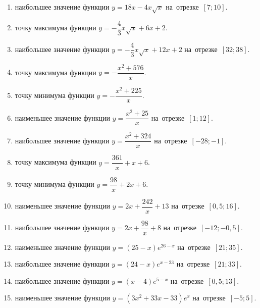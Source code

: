 \documentclass[a4paper,10pt]{article}
\begin{document}
\begin{enumerate}
\item {} наибольшее значение функции $y=18x -4x\sqrt{x}$ на~отрезке~$\left[7;10\right]$.

\item {} точку максимума функции $y=-\dfrac{4}{3}x\sqrt{x} +6x+2$.

\item {} наибольшее значение функции $y=-\dfrac{4}{3}x\sqrt{x} +12x+2$ на~отрезке~$\left[32;38\right]$.

\item {} точку максимума функции $y=-\dfrac{x^2 +576}{x}$.

\item {} точку минимума функции $y=-\dfrac{x^2 +225}{x}$.

\item {} наименьшее значение функции $y=\dfrac{x^2 +25}{x}$ на~отрезке~$\left[1;12\right]$.

\item {} наибольшее значение функции $y=\dfrac{x^2 +324}{x}$ на~отрезке~$\left[-28;-1\right]$.

\item {} точку максимума функции $y=\dfrac{361}{x} +x+6$.

\item {} точку минимума функции $y=\dfrac{98}{x} +2x+6$.

\item {} наименьшее значение функции $y=2x+\dfrac{242}{x} +13$ на~отрезке~$\left[0,5;16\right]$.

\item {} наибольшее значение функции $y=2x+\dfrac{98}{x} +8$ на~отрезке~$\left[-12;-0,5\right]$.

\item {} наименьшее значение функции $y=\left(25-x\right)e^{26-x}$ на~отрезке~$\left[21;35\right]$.

\item {} наибольшее значение функции $y=\left(24-x\right)e^{x-23}$ на~отрезке~$\left[21;33\right]$.

\item {} наибольшее значение функции $y=\left(x-4\right)e^{5-x}$ на~отрезке~$\left[0,5;13\right]$.

\item {} наименьшее значение функции $y=\left(3x^2 +33x -33\right)e^{x }$ на~отрезке~$\left[-5;5\right]$.


\end{enumerate}
\end{document}
